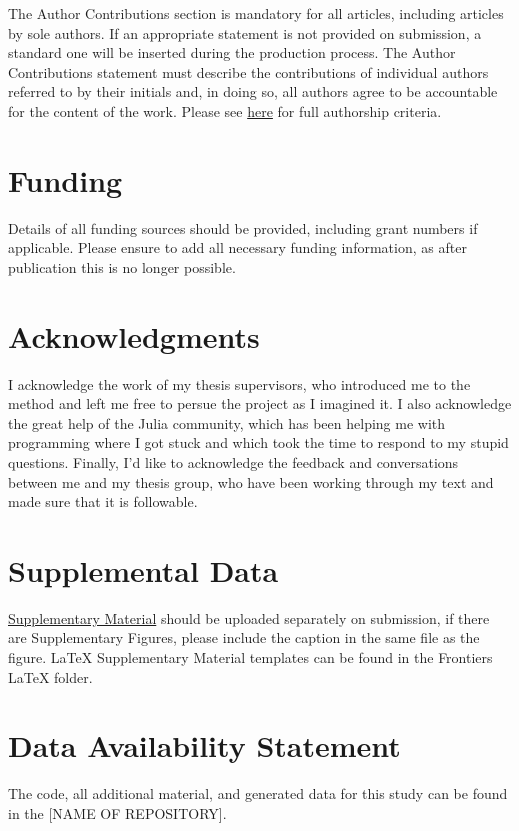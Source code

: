 \documentclass[utf8]{FrontiersinVancouver}
\begin{document}
The Author Contributions section is mandatory for all articles, including articles by sole authors. If an appropriate statement is not provided on submission, a standard one will be inserted during the production process. The Author Contributions statement must describe the contributions of individual authors referred to by their initials and, in doing so, all authors agree to be accountable for the content of the work. Please see  \href{https://www.frontiersin.org/about/policies-and-publication-ethics#AuthorshipAuthorResponsibilities}{here} for full authorship criteria.

\section*{Funding}
Details of all funding sources should be provided, including grant numbers if applicable. Please ensure to add all necessary funding information, as after publication this is no longer possible.

\section*{Acknowledgments}
I acknowledge the work of my thesis supervisors, who introduced me to the method and left me free to persue the project as I imagined it. I also acknowledge the great help of the Julia community, which has been helping me with programming where I got stuck and which took the time to respond to my stupid questions. Finally, I'd like to acknowledge the feedback and conversations between me and my thesis group, who have been working through my text and made sure that it is followable.

\section*{Supplemental Data}
 \href{http://home.frontiersin.org/about/author-guidelines#SupplementaryMaterial}{Supplementary Material} should be uploaded separately on submission, if there are Supplementary Figures, please include the caption in the same file as the figure. LaTeX Supplementary Material templates can be found in the Frontiers LaTeX folder.

\section*{Data Availability Statement}
The code, all additional material, and generated data for this study can be found in the [NAME OF REPOSITORY]{}.
\end{document}
